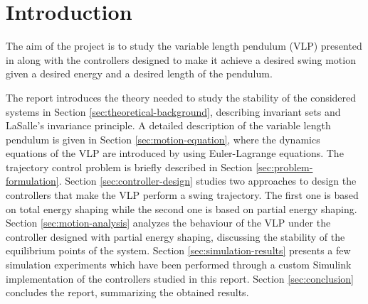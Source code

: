 \documentclass[main.tex]{subfiles}
\begin{document}
\section{Introduction}
The aim of the project is to study the variable length 
pendulum (VLP) presented in \cite{xin2014control} along
with the controllers designed to make it achieve a 
desired swing motion given a desired energy and a desired
length of the pendulum.

The report introduces the theory needed to
study the stability of the considered systems in Section
\ref{sec:theoretical-background}, describing invariant
sets and LaSalle's invariance principle. A detailed
description of the variable length pendulum is given in
Section \ref{sec:motion-equation}, where the dynamics
equations of the VLP are introduced by using Euler-Lagrange
equations. The trajectory control problem is briefly
described in Section \ref{sec:problem-formulation}.
Section \ref{sec:controller-design} studies two approaches
to design the controllers that make the VLP perform a
swing trajectory. The first one is based on total energy
shaping while the second one is based on partial energy shaping.
Section \ref{sec:motion-analysis} analyzes the behaviour
of the VLP under the controller designed with partial
energy shaping, discussing the stability of the
equilibrium points of the system. Section
\ref{sec:simulation-results} presents a few simulation
experiments which have been performed through a custom
Simulink implementation of the controllers studied in
this report. Section \ref{sec:conclusion} concludes
the report, summarizing the obtained results.
\end{document}
